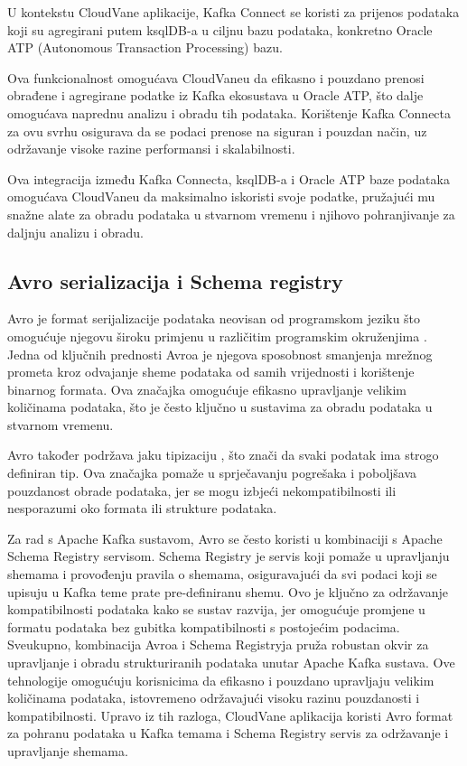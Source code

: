 \documentclass[times, utf8, diplomski]{fer}
\begin{document}
U kontekstu CloudVane aplikacije, Kafka Connect se koristi za prijenos podataka koji su agregirani putem ksqlDB-a u ciljnu bazu podataka, konkretno Oracle ATP (Autonomous Transaction Processing) bazu.

Ova funkcionalnost omogućava CloudVaneu da efikasno i pouzdano prenosi obrađene i agregirane podatke iz Kafka ekosustava u Oracle ATP, što dalje omogućava naprednu analizu i obradu tih podataka. Korištenje Kafka Connecta za ovu svrhu osigurava da se podaci prenose na siguran i pouzdan način, uz održavanje visoke razine performansi i skalabilnosti.

Ova integracija između Kafka Connecta, ksqlDB-a i Oracle ATP baze podataka omogućava CloudVaneu da maksimalno iskoristi svoje podatke, pružajući mu snažne alate za obradu podataka u stvarnom vremenu i njihovo pohranjivanje za daljnju analizu i obradu.

\clearpage
\subsection{Avro serializacija i Schema registry}
\label{sec:schema}

Avro je format serijalizacije podataka neovisan od programskom jeziku što omogućuje njegovu široku primjenu u različitim programskim okruženjima \citep{shapira_kafka_2021}. Jedna od ključnih prednosti Avroa je njegova sposobnost smanjenja mrežnog prometa kroz odvajanje sheme podataka od samih vrijednosti i korištenje binarnog formata. Ova značajka omogućuje efikasno upravljanje velikim količinama podataka, što je često ključno u sustavima za obradu podataka u stvarnom vremenu.

Avro također podržava jaku tipizaciju , što znači da svaki podatak ima strogo definiran tip. Ova značajka pomaže u sprječavanju pogrešaka i poboljšava pouzdanost obrade podataka, jer se mogu izbjeći nekompatibilnosti ili nesporazumi oko formata ili strukture podataka.

Za rad s Apache Kafka sustavom, Avro se često koristi u kombinaciji s Apache Schema Registry servisom. Schema Registry je servis koji pomaže u upravljanju shemama i provođenju pravila o shemama, osiguravajući da svi podaci koji se upisuju u Kafka teme prate pre-definiranu shemu. Ovo je ključno za održavanje kompatibilnosti podataka kako se sustav razvija, jer omogućuje promjene u formatu podataka bez gubitka kompatibilnosti s postojećim podacima. \\

Sveukupno, kombinacija Avroa i Schema Registryja pruža robustan okvir za upravljanje i obradu strukturiranih podataka unutar Apache Kafka sustava. Ove tehnologije omogućuju korisnicima da efikasno i pouzdano upravljaju velikim količinama podataka, istovremeno održavajući visoku razinu pouzdanosti i kompatibilnosti. Upravo iz tih razloga, CloudVane aplikacija koristi Avro format za pohranu podataka u Kafka temama i Schema Registry servis za održavanje i upravljanje shemama.
\end{document}
